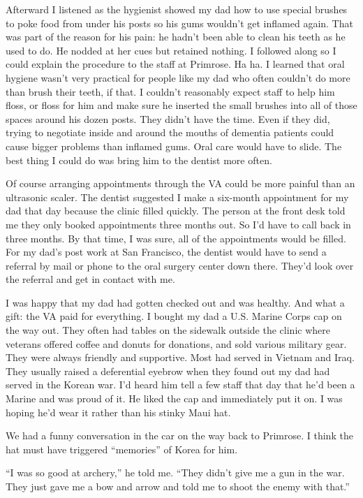 \documentclass[12pt]{book}
\begin{document}
Afterward I listened as the hygienist showed my dad how to use special brushes to poke food from under his posts so his gums wouldn't get inflamed again. That was part of the reason for his pain: he hadn't been able to clean his teeth as he used to do. He nodded at her cues but retained nothing. I followed along so I could explain the procedure to the staff at Primrose. Ha ha. I learned that oral hygiene wasn't very practical for people like my dad who often couldn't do more than brush their teeth, if that. I couldn't reasonably expect staff to help him floss, or floss for him and make sure he inserted the small brushes into all of those spaces around his dozen posts. They didn't have the time. Even if they did, trying to negotiate inside and around the mouths of dementia patients could cause bigger problems than inflamed gums. Oral care would have to slide. The best thing I could do was bring him to the dentist more often.

Of course arranging appointments through the VA could be more painful than an ultrasonic scaler. The dentist suggested I make a six-month appointment for my dad that day because the clinic filled quickly. The person at the front desk told me they only booked appointments three months out. So I'd have to call back in three months. By that time, I was sure, all of the appointments would be filled. For my dad's post work at San Francisco, the dentist would have to send a referral by mail or phone to the oral surgery center down there. They'd look over the referral and get in contact with me.

I was happy that my dad had gotten checked out and was healthy. And what a gift: the VA paid for everything. I bought my dad a U.S. Marine Corps cap on the way out. They often had tables on the sidewalk outside the clinic where veterans offered coffee and donuts for donations, and sold various military gear. They were always friendly and supportive. Most had served in Vietnam and Iraq. They usually raised a deferential eyebrow when they found out my dad had served in the Korean war. I'd heard him tell a few staff that day that he'd been a Marine and was proud of it. He liked the cap and immediately put it on. I was hoping he'd wear it rather than his stinky Maui hat.

We had a funny conversation in the car on the way back to Primrose. I think the hat must have triggered ``memories'' of Korea for him.

``I was so good at archery,'' he told me. ``They didn't give me a gun in the war. They just gave me a bow and arrow and told me to shoot the enemy with that.''
\end{document}
